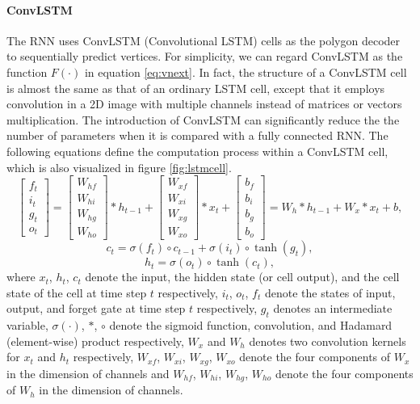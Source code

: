 \paragraph{ConvLSTM} The RNN uses ConvLSTM (Convolutional LSTM) cells as the polygon decoder to sequentially predict vertices. For simplicity, we can regard ConvLSTM as the function $F(\cdot)$ in equation \ref{eq:vnext}. In fact, the structure of a ConvLSTM cell is almost the same as that of an ordinary LSTM cell, except that it employs convolution in a 2D image with multiple channels instead of matrices or vectors multiplication. The introduction of ConvLSTM can significantly reduce the the number of parameters when it is compared with a fully connected RNN. The following equations define the computation process within a ConvLSTM cell, which is also visualized in figure \ref{fig:lstmcell}.
\begin{equation}
	\left[\begin{array}{c}
		f_t\\i_t\\g_t\\o_t
	\end{array}\right] = \left[\begin{array}{c}
		W_{hf}\\W_{hi}\\W_{hg}\\W_{ho}
	\end{array}\right] * h_{t-1} + \left[\begin{array}{c}
		W_{xf}\\W_{xi}\\W_{xg}\\W_{xo}
	\end{array}\right] * x_{t} + \left[\begin{array}{c}
		b_f\\b_i\\b_g\\b_o
	\end{array}\right] = W_h * h_{t-1} + W_x * x_t + b,
\end{equation}
\begin{equation}
	c_t = \sigma(f_t) \circ c_{t-1} + \sigma(i_t) \circ \tanh(g_t),
\end{equation}
\begin{equation}
	h_t = \sigma(o_t) \circ \tanh(c_t),
\end{equation}
where $x_t$, $h_t$, $c_t$ denote the input, the hidden state (or cell output), and the cell state of the cell at time step $t$ respectively, $i_t$, $o_t$, $f_t$ denote the states of input, output, and forget gate at time step $t$ respectively, $g_t$ denotes an intermediate variable, $\sigma(\cdot)$, $*$, $\circ$ denote the sigmoid function, convolution, and Hadamard (element-wise) product respectively, $W_x$ and $W_h$ denotes two convolution kernels for $x_t$ and $h_t$ respectively, $W_{xf}$, $W_{xi}$, $W_{xg}$, $W_{xo}$ denote the four components of $W_x$ in the dimension of channels and $W_{hf}$, $W_{hi}$, $W_{hg}$, $W_{ho}$ denote the four components of $W_h$ in the dimension of channels.

